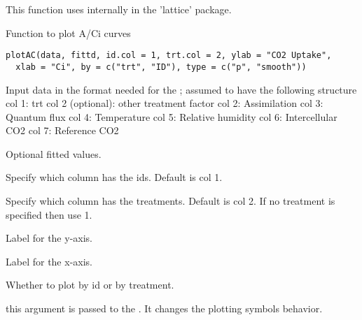 \documentclass[letterpaper]{book}
\begin{document}
%
\begin{Details}\relax
This function uses internally 
in the 'lattice' package.
\end{Details}
%
\begin{SeeAlso}\relax
{} 
\end{SeeAlso}
%
\begin{Description}\relax
Function to plot A/Ci curves
\end{Description}
%
\begin{Usage}
\begin{verbatim}
plotAC(data, fittd, id.col = 1, trt.col = 2, ylab = "CO2 Uptake",
  xlab = "Ci", by = c("trt", "ID"), type = c("p", "smooth"))
\end{verbatim}
\end{Usage}
%
\begin{Arguments}
\begin{ldescription}
\item[\code{data}] Input data in the format needed for the
; assumed to have the following
structure col 1: trt col 2 (optional): other treatment
factor col 2: Assimilation col 3: Quantum flux col 4:
Temperature col 5: Relative humidity col 6: Intercellular
CO2 col 7: Reference CO2

\item[\code{fittd}] Optional fitted values.

\item[\code{id.col}] Specify which column has the ids. Default
is col 1.

\item[\code{trt.col}] Specify which column has the treatments.
Default is col 2. If no treatment is specified then use
1.

\item[\code{ylab}] Label for the y-axis.

\item[\code{xlab}] Label for the x-axis.

\item[\code{by}] Whether to plot by id or by treatment.

\item[\code{type}] this argument is passed to the
. It changes the plotting symbols
behavior.
\end{ldescription}
\end{Arguments}
\end{document}
